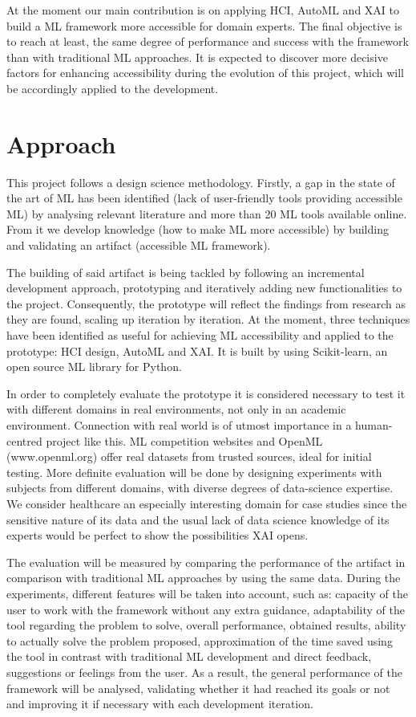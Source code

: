 \documentclass[runningheads]{llncs}
\begin{document}
At the moment our main contribution is on applying HCI, AutoML and XAI to build a ML framework more accessible for domain experts. The final objective is to reach at least, the same degree of performance and success with the framework than with traditional ML approaches. It is expected to discover more decisive factors for enhancing accessibility during the evolution of this project, which will be accordingly applied to the development. 


\section{Approach}

This project follows a design science methodology. Firstly, a gap in the state of the art of ML has been identified (lack of user-friendly tools providing accessible ML) by analysing relevant literature and more than 20 ML tools available online. From it we develop knowledge (how to make ML more accessible) by building and validating an artifact (accessible ML framework).

The building of said artifact is being tackled by following an incremental development approach, prototyping and iteratively adding new functionalities to the project. Consequently, the prototype will reflect the findings from research as they are found, scaling up iteration by iteration. 
At the moment, three techniques have been identified as useful for achieving ML accessibility and applied to the prototype: HCI design, AutoML and XAI. It is built by using Scikit-learn, an open source ML library for Python.

In order to completely evaluate the prototype it is considered necessary to test it with different domains in real environments, not only in an academic environment. Connection with real world is of utmost importance in a human-centred project like this. ML competition websites and OpenML (www.openml.org) offer real datasets from trusted sources, ideal for initial testing. More definite evaluation will be done by designing experiments with subjects from different domains, with diverse degrees of data-science expertise. We consider healthcare an especially interesting domain for case studies since the sensitive nature of its data and the usual lack of data science knowledge of its experts would be perfect to show the possibilities XAI opens.

The evaluation will be measured by comparing the performance of the artifact in comparison with traditional ML approaches by using the same data.  During the experiments, different features will be taken into account, such as: capacity of the user to work with the framework without any extra guidance, adaptability of the tool regarding the problem to solve, overall performance, obtained results, ability to actually solve the problem proposed, approximation of the time saved using the tool in contrast with traditional ML development and direct feedback, suggestions or feelings from the user. As a result, the general performance of the framework will be analysed, validating whether it had reached its goals or not and improving it if necessary with each development iteration.
\end{document}
